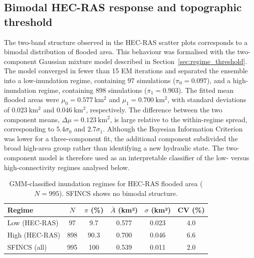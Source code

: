 \documentclass[a4paper,fleqn]{cas-sc}
\newcommand{\sfincs}{\textsc{SFINCS}}
\newcommand{\hecras}{\textsc{HEC-RAS}}
\begin{document}
\subsection{Bimodal HEC-RAS response and topographic threshold}\label{sec:res_bifurcation}
The two-band structure observed in the \hecras{} scatter plots corresponds to a bimodal distribution of flooded area. This behaviour was formalised with the two-component Gaussian mixture model described in Section~\ref{sec:regime_threshold}. The model converged in fewer than 15 EM iterations and separated the ensemble into a low-inundation regime, containing 97 simulations ($\pi_0=0.097$), and a high-inundation regime, containing 898 simulations ($\pi_1=0.903$). The fitted mean flooded areas were $\mu_0=0.577~\mathrm{km^2}$ and $\mu_1=0.700~\mathrm{km^2}$, with standard deviations of $0.023~\mathrm{km^2}$ and $0.046~\mathrm{km^2}$, respectively. The difference between the two component means, $\Delta\mu=0.123~\mathrm{km^2}$, is large relative to the within-regime spread, corresponding to $5.4\sigma_0$ and $2.7\sigma_1$. Although the Bayesian Information Criterion was lower for a three-component fit, the additional component subdivided the broad high-area group rather than identifying a new hydraulic state. The two-component model is therefore used as an interpretable classifier of the low- versus high-connectivity regimes analysed below.

\begin{table}[htbp]
\centering
\caption{GMM-classified inundation regimes for \hecras{} flooded area
($N = 995$). \sfincs{} shows no bimodal structure.}
\label{tab:gmm}
\small
\begin{tabular}{lccccc}
\toprule
Regime & $N$ & $\pi$ (\%) & $\bar{A}$ (km²) & $\sigma$ (km²) & CV (\%) \\
\midrule
Low  (HEC-RAS) &  97 &  9.7 & 0.577 & 0.023 & 4.0 \\
High (HEC-RAS) & 898 & 90.3 & 0.700 & 0.046 & 6.6 \\
\midrule
SFINCS (all)   & 995 & 100  & 0.539 & 0.011 & 2.0 \\
\bottomrule
\end{tabular}
\end{table}
\end{document}
